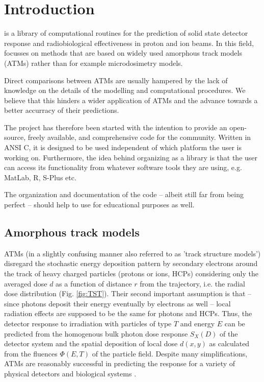 
\chapter{Introduction}

\la{} is a library of computational routines for the prediction of solid state detector response and radiobiological effectiveness in proton and ion beams. In this field, \la{} focusses on methods that are based on widely used amorphous track models (ATMs) rather than for example microdosimetry models.

Direct comparisons between ATMs are usually hampered by the lack of knowledge on the details of the modelling and computational procedures. We believe that this hinders a wider application of ATMs and the advance towards a better accurracy of their predictions. 

The \la{} project has therefore been started with the intention to provide an open-source, freely available, and comprehensive code for the community. Written in ANSI C, it is designed to be used independent of which platform the user is working on. Furthermore, the idea behind organizing \la{} as a library is that the user can access its functionality from whatever software tools they are using, e.g. MatLab, R, S-Plus etc.

The organization and documentation of the code -- albeit still far from being perfect -- should help to use \la{} for educational purposes as well.


\section{Amorphous track models}

ATMs (in a slightly confusing manner also referred to as 'track structure models') disregard the stochastic energy deposition pattern by secondary electrons around the track of heavy charged particles (protons or ions, HCPs) considering only the averaged dose $d$ as a function of distance $r$ from the trajectory, i.e. the radial dose distribution (Fig. \ref{fig:TST}). 
Their second important assumption is that -- since photons deposit their energy eventually by electrons as well -- local radiation effects are supposed to be the same for photons and HCPs. Thus, the detector response to irradiation with particles of type $T$ and energy $E$ can be predicted from the homogenous bulk photon dose response $S_X(D)$ of the detector system and the spatial deposition of local dose $d(x,y)$ as calculated from the fluences $\Phi(E, T)$ of the particle field. Despite many simplifications, ATMs are reasonably successful in predicting the response for a variety of physical detectors and biological systems \cite{Katz_et_al_1972, Waligorski_and_Katz_1980, Geiss_et_al_1997, Bassler_et_al_2008}. 

